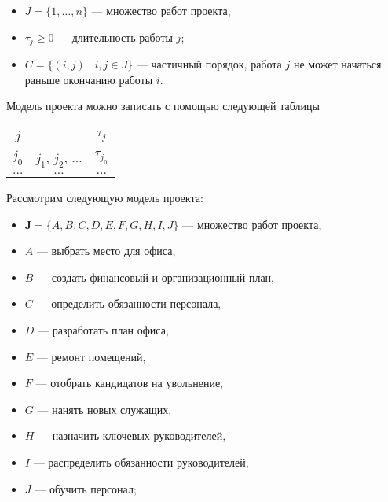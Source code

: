 \begin{itemize}[nosep]
	\item $J = \{1, \dots, n\}$ --- множество работ проекта,
	
	\item $\tau_{j} \ge 0$ --- длительность работы $j$;
	
	\item $C = \big\{(i, j) \; \big| \; i,j \in J\big\}$ --- частичный порядок, работа $j$ не может начаться раньше окончанию работы $i$.
\end{itemize}

Модель проекта можно записать с помощью следующей таблицы

\begin{table}[H]
	\centering
	\begin{tabular}{ | c | c | c | } 
		\hline
		$j$ & \text{следующие работы} & $\tau_j$ \\ \hline
		$j_0$ & $j_1$, $j_2$, $\dots$ & $\tau_{j_0}$ \\ \hline
		$\dots$ & $\dots$ & $\dots$ \\ \hline
	\end{tabular}
\end{table}

\example

Рассмотрим следующую модель проекта:

\begin{itemize}[nosep]
	\item $\mathbf{J} = \{A, B, C, D, E, F, G, H, I, J\}$ --- множество работ проекта,
	
	\item $A$ --- выбрать место для офиса,
	
	\item $B$ --- создать финансовый и организационный план,
	
	\item $C$ --- определить обязанности персонала,
	
	\item $D$ --- разработать план офиса,
	
	\item $E$ --- ремонт помещений,
	
	\item $F$ --- отобрать кандидатов на увольнение,
	
	\item $G$ --- нанять новых служащих,
	
	\item $H$ --- назначить ключевых руководителей,
	
	\item $I$ --- распределить обязанности руководителей,
	
	\item $J$ --- обучить персонал;
\end{itemize}

